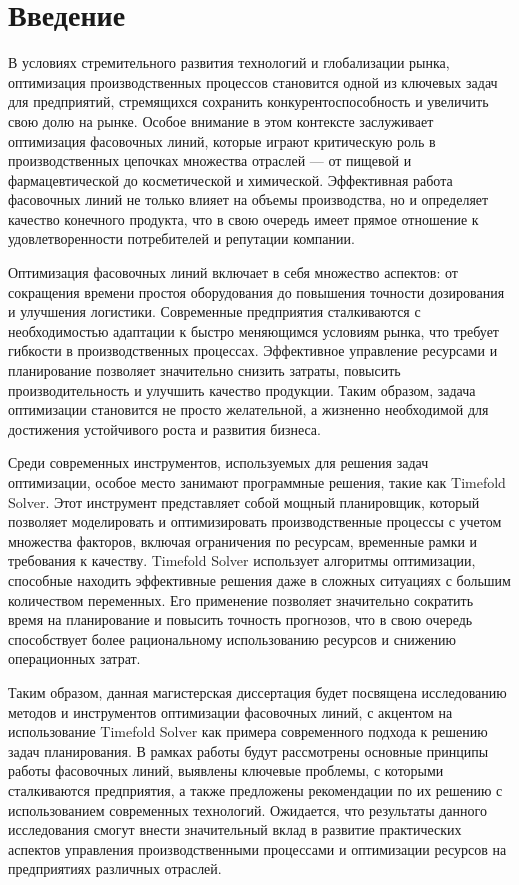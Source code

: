 \chapter*{Введение}

В условиях стремительного развития технологий и глобализации рынка, оптимизация производственных процессов становится одной из ключевых задач для предприятий, стремящихся сохранить конкурентоспособность и увеличить свою долю на рынке. Особое внимание в этом контексте заслуживает оптимизация фасовочных линий, которые играют критическую роль в производственных цепочках множества отраслей — от пищевой и фармацевтической до косметической и химической. Эффективная работа фасовочных линий не только влияет на объемы производства, но и определяет качество конечного продукта, что в свою очередь имеет прямое отношение к удовлетворенности потребителей и репутации компании.

Оптимизация фасовочных линий включает в себя множество аспектов: от сокращения времени простоя оборудования до повышения точности дозирования и улучшения логистики. Современные предприятия сталкиваются с необходимостью адаптации к быстро меняющимся условиям рынка, что требует гибкости в производственных процессах. Эффективное управление ресурсами и планирование позволяет значительно снизить затраты, повысить производительность и улучшить качество продукции. Таким образом, задача оптимизации становится не просто желательной, а жизненно необходимой для достижения устойчивого роста и развития бизнеса.

Среди современных инструментов, используемых для решения задач оптимизации, особое место занимают программные решения, такие как Timefold Solver. Этот инструмент представляет собой мощный планировщик, который позволяет моделировать и оптимизировать производственные процессы с учетом множества факторов, включая ограничения по ресурсам, временные рамки и требования к качеству. Timefold Solver использует алгоритмы оптимизации, способные находить эффективные решения даже в сложных ситуациях с большим количеством переменных. Его применение позволяет значительно сократить время на планирование и повысить точность прогнозов, что в свою очередь способствует более рациональному использованию ресурсов и снижению операционных затрат.

Таким образом, данная магистерская диссертация будет посвящена исследованию методов и инструментов оптимизации фасовочных линий, с акцентом на использование Timefold Solver как примера современного подхода к решению задач планирования. В рамках работы будут рассмотрены основные принципы работы фасовочных линий, выявлены ключевые проблемы, с которыми сталкиваются предприятия, а также предложены рекомендации по их решению с использованием современных технологий. Ожидается, что результаты данного исследования смогут внести значительный вклад в развитие практических аспектов управления производственными процессами и оптимизации ресурсов на предприятиях различных отраслей.